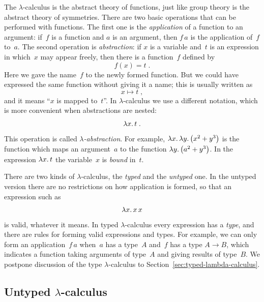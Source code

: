 The $\lambda$-calculus is the abstract theory of functions, just like
group theory is the abstract theory of symmetries. There are two basic
operations that can be performed with functions. The first one is the
\emph{application} of a function to an argument: if~$f$ is a function
and $a$ is an argument, then $f\, a$ is the application of~$f$ to~$a$.
The second operation is \emph{abstraction}: if $x$ is a variable
and~$t$ is an expression in which~$x$ may appear freely, then there is
a function~$f$ defined by
%
\begin{equation*}
  f(x) = t \;.
\end{equation*}
%
Here we gave the name~$f$ to the newly formed function. But we could
have expressed the same function without giving it a name;
this is usually written as
%
\begin{equation*}
  x \mapsto t \;,
\end{equation*}
%
and it means ``$x$ is mapped to~$t$''. In $\lambda$-calculus we use a
different notation, which is more convenient when abstractions are
nested:
%
\begin{equation*}
  \lambda x .\,t \;.
\end{equation*}
%
This operation is called \emph{$\lambda$-abstraction}. For example,
$\lambda x .\,\lambda y .\left(x^2 + y^3\right)$ is the function which maps an
argument~$a$ to the function $\lambda y .\left(a^2 + y^3\right)$. In the expression
$\lambda x .\,t$ the variable~$x$ is \emph{bound} in~$t$.

There are two kinds of $\lambda$-calculus, the \emph{typed} and the
\emph{untyped} one. In the untyped version there are no restrictions
on how application is formed, so that an expression such as
%
\begin{equation*}
  \lambda x .\,x\, x
\end{equation*}
%
is valid, whatever it means. In typed $\lambda$-calculus every
expression has a \emph{type}, and there are rules for forming valid
expressions and types. For example, we can only form an
application~$f\, a$ when~$a$ has a type~$A$ and~$f$ has a type $A \to
B$, which indicates a function taking arguments of type~$A$ and giving
results of type~$B$. We postpone discussion of the type
$\lambda$-calculus to Section~\ref{sec:typed-lambda-calculus}.

\subsection{Untyped $\lambda$-calculus}
\label{sec:untyped-lambda-calculus}


